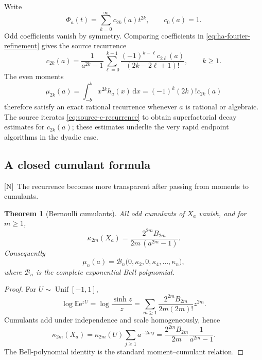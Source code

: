 \documentclass[11pt,oneside]{article}
\newtheorem{theorem}{Theorem}[section]
\theoremstyle{definition}
\theoremstyle{remark}
\newcommand{\e}{\mathrm e}
\newcommand{\dd}{\,\mathrm d}
\newcommand{\E}{\mathbb E}
\newcommand{\Nmark}{\textcolor{newgreen}{\textsf{[N]}}}
\begin{document}
Write
\begin{equation}
 \Phi_a(t)=\sum_{k=0}^{\infty}c_{2k}(a)t^{2k},
 \qquad c_0(a)=1.
 \label{eq:coefficient-expansion}
\end{equation}
Odd coefficients vanish by symmetry.  Comparing coefficients in
\eqref{eq:ha-fourier-refinement} gives the source recurrence
\begin{equation}
 c_{2k}(a)=\frac1{a^{2k}-1}
 \sum_{\ell=0}^{k-1}
 \frac{(-1)^{k-\ell}c_{2\ell}(a)}{(2k-2\ell+1)!},
 \qquad k\ge1.
 \tag{S3.32}
 \label{eq:source-c-recurrence}
\end{equation}
The even moments
\begin{equation}
 \mu_{2k}(a)=\int_{-b}^{b}x^{2k}h_a(x)\dd x
            =(-1)^k(2k)!c_{2k}(a)
 \tag{S3.36--S3.37}
 \label{eq:moment-coefficient}
\end{equation}
therefore satisfy an exact rational recurrence whenever $a$ is rational or algebraic.
The source iterates \eqref{eq:source-c-recurrence} to obtain superfactorial decay estimates
for $c_{2k}(a)$; these estimates underlie the very rapid endpoint algorithms in the dyadic
case.

\subsection{A closed cumulant formula}

\Nmark\ The recurrence becomes more transparent after passing from moments to cumulants.

\begin{theorem}[Bernoulli cumulants]
\label{thm:cumulants}
All odd cumulants of $X_a$ vanish, and for $m\ge1$,
\begin{equation}
 \boxed{\quad
 \kappa_{2m}(X_a)=
 \frac{2^{2m}B_{2m}}{2m\,(a^{2m}-1)}.
 \quad}
 \label{eq:cumulant-formula}
\end{equation}
Consequently
\begin{equation}
 \mu_n(a)=\mathcal B_n\bigl(0,\kappa_2,0,\kappa_4,\ldots,\kappa_n\bigr),
 \label{eq:Bell-moments}
\end{equation}
where $\mathcal B_n$ is the complete exponential Bell polynomial.
\end{theorem}

\begin{proof}
For $U\sim\operatorname{Unif}[-1,1]$,
\[
 \log\E\e^{zU}=\log\frac{\sinh z}{z}
 =\sum_{m\ge1}\frac{2^{2m}B_{2m}}{2m(2m)!}z^{2m}.
\]
Cumulants add under independence and scale homogeneously, hence
\[
 \kappa_{2m}(X_a)=\kappa_{2m}(U)\sum_{j\ge1}a^{-2mj}
 =\frac{2^{2m}B_{2m}}{2m}\frac1{a^{2m}-1}.
\]
The Bell-polynomial identity is the standard moment--cumulant relation.
\end{proof}
\end{document}
